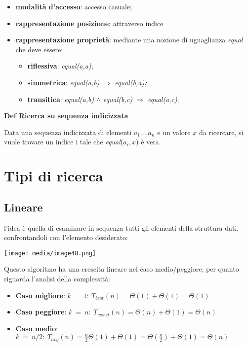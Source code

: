 \begin{itemize}
\item
  \textbf{modalità d'accesso}: accesso casuale;
\item
  \textbf{rappresentazione posizione}: attraverso indice
\item
  \textbf{rappresentazione proprietà}: mediante una nozione di
  uguaglianza \emph{equal} che deve essere:

  \begin{itemize}
  \item
    \textbf{riflessiva}: \emph{equal(a,a)};
  \item
    \textbf{simmetrica}: \emph{equal(a,b)} \(\Rightarrow\)
    \emph{equal(b,a)\textbf{;}}
  \item
    \textbf{transitica}: \emph{equal(a,b)} \(\land\) \emph{equal(b,c)}
    \(\Rightarrow\) \emph{equal(a,c)}.
  \end{itemize}
\end{itemize}

\textbf{Def \textbar{} Ricerca su sequenza indicizzata}

Data una sequenza indicizzata di elementi \(a_{1}....a_{n}\) e un valore
\(x\) da ricercare, si vuole trovare un indice i tale che
\emph{equal}(\(a_{i},x\)) è vera.

\section{Tipi di ricerca}\label{tipi-di-ricerca}

\subsection{Lineare}\label{lineare}

l'idea è quella di esaminare in sequenza tutti gli elementi della
struttura dati, confrontandoli con l'elemento desiderato:

\texttt{[image: media/image48.png]}

Questo algoritmo ha una crescita lineare nel caso medio/peggiore, per
quanto riguarda l'analisi della complessità:

\begin{itemize}
\item
  \textbf{Caso migliore}:
  \(k\  = \ 1:\ T_{best}(n) = \Theta(1) + \Theta(1) = \Theta(1)\)
\item
  \textbf{Caso peggiore}:
  \(k\  = \ n:\ T_{worst}(n) = \Theta(n) + \Theta(1) = \Theta(n)\)
\item
  \textbf{Caso medio}:
  \(k\  = \ n/2:\ T_{avg}(n) = \frac{n}{2}\Theta(1) + \Theta(1) = \Theta(\frac{n}{2}) + \Theta(1) = \Theta(n)\)
\end{itemize}

